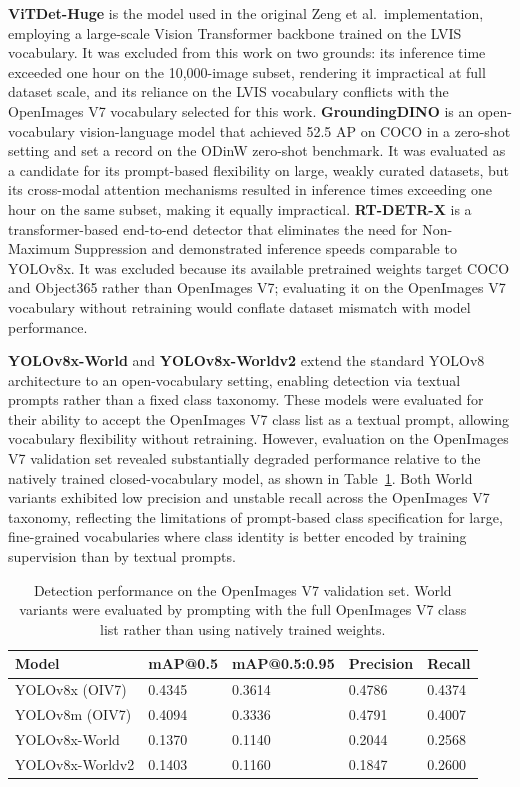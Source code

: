 \textbf{ViTDet-Huge} \cite{Li_2022_ViTDet} is the model used in the original 
Zeng et al.\ implementation, employing a large-scale Vision Transformer backbone 
trained on the LVIS vocabulary. It was excluded from this work on two grounds: 
its inference time exceeded one hour on the 10{,}000-image subset, rendering it 
impractical at full dataset scale, and its reliance on the LVIS vocabulary 
conflicts with the OpenImages V7 vocabulary selected for this work. 
\textbf{GroundingDINO} \cite{Liu_2024_GroundingDINO} is an open-vocabulary 
vision-language model that achieved 52.5 AP on COCO in a zero-shot setting and 
set a record on the ODinW zero-shot benchmark. It was evaluated as a candidate 
for its prompt-based flexibility on large, weakly curated datasets, but its 
cross-modal attention mechanisms resulted in inference times exceeding one hour 
on the same subset, making it equally impractical. \textbf{RT-DETR-X} 
\cite{Zhao_2024_RTDETR} is a transformer-based end-to-end detector that 
eliminates the need for Non-Maximum Suppression and demonstrated inference 
speeds comparable to YOLOv8x. It was excluded because its available pretrained 
weights target COCO and Object365 rather than OpenImages V7; evaluating it on 
the OpenImages V7 vocabulary without retraining would conflate dataset mismatch 
with model performance.

\textbf{YOLOv8x-World} and \textbf{YOLOv8x-Worldv2} extend the standard 
YOLOv8 architecture to an open-vocabulary setting, enabling detection via 
textual prompts rather than a fixed class taxonomy. These models were evaluated 
for their ability to accept the OpenImages V7 class list as a textual prompt, 
allowing vocabulary flexibility without retraining. However, evaluation on the 
OpenImages V7 validation set revealed substantially degraded performance relative 
to the natively trained closed-vocabulary model, as shown in 
Table~\ref{tab:objdet_oiv7}. Both World variants exhibited low precision and 
unstable recall across the OpenImages V7 taxonomy, reflecting the limitations of 
prompt-based class specification for large, fine-grained vocabularies where class 
identity is better encoded by training supervision than by textual prompts.

\begin{table}[ht]
	\centering
	\caption{Detection performance on the OpenImages V7 validation set. 
		World variants were evaluated by prompting with the full OpenImages V7 
		class list rather than using natively trained weights.}
	\label{tab:objdet_oiv7}
	\begin{tabular}{lllll}
		\hline
		\textbf{Model} & \textbf{mAP@0.5} & \textbf{mAP@0.5:0.95} & 
		\textbf{Precision} & \textbf{Recall} \\
		\hline
		YOLOv8x (OIV7)     & 0.4345 & 0.3614 & 0.4786 & 0.4374 \\
		YOLOv8m (OIV7)     & 0.4094 & 0.3336 & 0.4791 & 0.4007 \\
		YOLOv8x-World      & 0.1370 & 0.1140 & 0.2044 & 0.2568 \\
		YOLOv8x-Worldv2    & 0.1403 & 0.1160 & 0.1847 & 0.2600 \\
		\hline
	\end{tabular}
\end{table}

